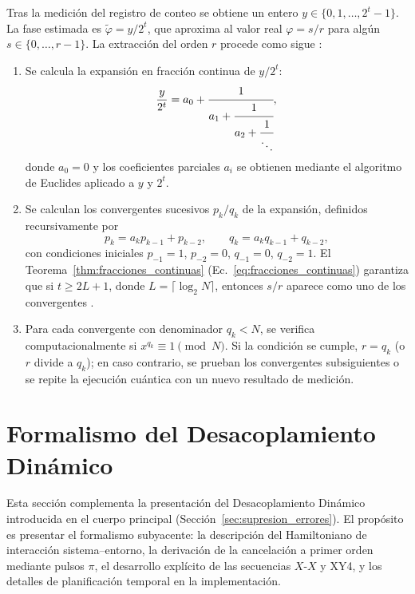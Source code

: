 \documentclass[12pt, spanish]{book}
\begin{document}
Tras la medición del registro de conteo se obtiene un entero $y \in \{0, 1, \ldots, 2^t - 1\}$. La fase estimada es $\tilde{\varphi} = y/2^t$, que aproxima al valor real $\varphi = s/r$ para algún $s \in \{0, \ldots, r-1\}$. La extracción del orden $r$ procede como sigue \cite{Nielsen2024}:
\begin{enumerate}
    \item Se calcula la expansión en fracción continua de $y/2^t$:
          \begin{equation}
              \frac{y}{2^t} = a_0 + \cfrac{1}{a_1 + \cfrac{1}{a_2 + \cfrac{1}{\ddots}}},
              \label{eq:fraccion_continua_expansion}
          \end{equation}
          donde $a_0 = 0$ y los coeficientes parciales $a_i$ se obtienen mediante el algoritmo de Euclides aplicado a $y$ y $2^t$.
    \item Se calculan los convergentes sucesivos $p_k/q_k$ de la expansión, definidos recursivamente por
          \begin{equation}
              p_k = a_k p_{k-1} + p_{k-2}, \qquad q_k = a_k q_{k-1} + q_{k-2},
              \label{eq:convergentes}
          \end{equation}
          con condiciones iniciales $p_{-1} = 1$, $p_{-2} = 0$, $q_{-1} = 0$, $q_{-2} = 1$. El Teorema~\ref{thm:fracciones_continuas} (Ec.~\ref{eq:fracciones_continuas}) garantiza que si $t \geq 2L + 1$, donde $L = \lceil \log_2 N \rceil$, entonces $s/r$ aparece como uno de los convergentes \cite{Nielsen2024}.
    \item Para cada convergente con denominador $q_k < N$, se verifica computacionalmente si $x^{q_k} \equiv 1 \pmod{N}$. Si la condición se cumple, $r = q_k$ (o $r$ divide a $q_k$); en caso contrario, se prueban los convergentes subsiguientes o se repite la ejecución cuántica con un nuevo resultado de medición.
\end{enumerate}

\section{Formalismo del Desacoplamiento Dinámico}
\label{app:dd-formal}

Esta sección complementa la presentación del Desacoplamiento Dinámico introducida en el cuerpo principal (Sección~\ref{sec:supresion_errores}). El propósito es presentar el formalismo subyacente: la descripción del Hamiltoniano de interacción sistema--entorno, la derivación de la cancelación a primer orden mediante pulsos $\pi$, el desarrollo explícito de las secuencias $X$-$X$ y XY4, y los detalles de planificación temporal en la implementación.\\
\end{document}
